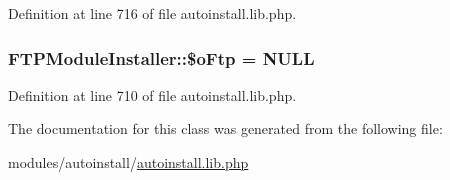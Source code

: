 Definition at line 716 of file autoinstall.\+lib.\+php.

\hypertarget{classFTPModuleInstaller_a7df6cf65240fbb39a7d763e10b236dc9}{
\subsubsection[{\$o\+Ftp}]{\setlength{\rightskip}{0pt plus 5cm}F\+T\+P\+Module\+Installer\+::\$o\+Ftp = N\+U\+L\+L}}\label{classFTPModuleInstaller_a7df6cf65240fbb39a7d763e10b236dc9}


Definition at line 710 of file autoinstall.\+lib.\+php.



The documentation for this class was generated from the following file\+:\begin{DoxyCompactItemize}
\item 
modules/autoinstall/\hyperlink{autoinstall_8lib_8php}{autoinstall.\+lib.\+php}\end{DoxyCompactItemize}
